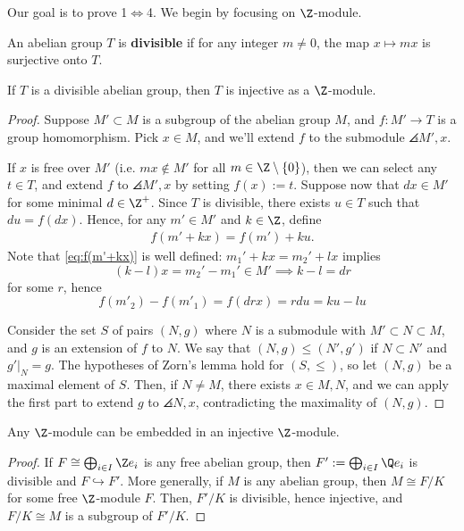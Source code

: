 Our goal is to prove 1$\iff$4. We begin by focusing on $\Z$-module.

\begin{defn}
    An abelian group $T$ is \textbf{divisible} if for any integer $m \neq 0$, the map $x \mapsto mx$ is surjective onto $T$.
\end{defn}

\begin{prop}
    If $T$ is a divisible abelian group, then $T$ is injective as a $\Z$-module.
\end{prop}

\begin{proof}
    Suppose $M' \subset M$ is a subgroup of the abelian group $M$, and $f:M' \to T$ is a group homomorphism. Pick $x \in M$, and we'll extend $f$ to the submodule $\angles{M',x}$.

    If $x$ is free over $M'$ (i.e. $mx \not \in M'$ for all $m \in \Z\setminus\{0\}$), then we can select any $t \in T$, and extend $f$ to $\angles{M',x}$ by setting $f(x) :=t$. Suppose now that $dx\in M'$ for some minimal $d \in \Z^+$. Since $T$ is divisible, there exists $u \in T$ such that $du = f(dx)$. Hence, for any $m' \in M'$ and $k\in \Z$, define
    \begin{align} \label{eq:f(m'+kx)}
        f(m'+kx)=f(m') + ku.
    \end{align}
    Note that \eqref{eq:f(m'+kx)} is well defined: $m_1'+kx = m_2'+lx$ implies
    $$(k-l)x=m_2'-m_1' \in M' \implies k-l = dr$$
    for some $r$, hence
    $$f(m'_2) - f(m'_1) = f(drx)=rdu=ku-lu$$

    Consider the set $S$ of pairs $(N,g)$ where $N$ is a submodule with $M' \subset N \subset M$, and $g$ is an extension of $f$ to $N$. We say that $(N,g) \leq (N',g')$ if $N \subset N'$ and $g'|_N=g$. The hypotheses of Zorn's lemma hold for $(S,\leq)$, so let $(N,g)$ be a maximal element of $S$. Then, if $N \neq M$, there exists $x \in M,N$, and we can apply the first part to extend $g$ to $\angles{N,x}$, contradicting the maximality of $(N,g)$.
\end{proof}

\begin{cor}
    Any $\Z$-module can be embedded in an injective $\Z$-module.
\end{cor}

\begin{proof}
    If $F \cong \bigoplus_{i\in I}\Z e_i$ is any free abelian group, then $F':= \bigoplus_{i \in I}\Q e_i$ is divisible and $F \hookrightarrow F'$. More generally, if $M$ is any abelian group, then $M \cong F/K$ for some free $\Z$-module $F$. Then, $F'/K$ is divisible, hence injective, and $F/K \cong M$ is a subgroup of $F'/K$.
\end{proof}

